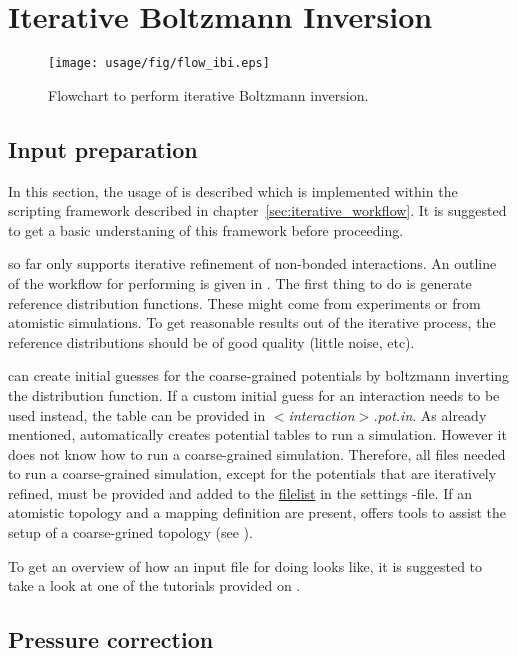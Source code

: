 \chapter{Iterative Boltzmann Inversion}
\begin{figure}
   \centering
   \texttt{[image: usage/fig/flow\_ibi.eps]}
   \caption{\label{fig:flow_ibi}Flowchart to perform iterative Boltzmann inversion.}
\end{figure}

\section{Input preparation}
In this section, the usage of \ibi is described which is implemented within the scripting framework described in chapter~\ref{sec:iterative_workflow}. It is suggested to get a basic understaning of this framework before proceeding.

\ibi so far only supports iterative refinement of non-bonded interactions. An outline of the workflow for performing \ibi is given in . The first thing to do is generate reference distribution functions. These might come from experiments or from atomistic simulations. To get reasonable results out of the iterative process, the reference distributions should be of good quality (little noise, etc).

\votca can create initial guesses for the coarse-grained potentials by boltzmann inverting the distribution function. If a custom initial guess for an interaction needs to be used instead, the table can be provided in \textit{$<$interaction$>$.pot.in}. As already mentioned, \votca automatically creates potential tables to run a simulation. However it does not know how to run a coarse-grained simulation. Therefore, all files needed to run a coarse-grained simulation, except for the potentials that are iteratively refined, must be provided and added to the \hyperlink{\cgref{inverse.filelist}}{filelist} in the settings \xml-file. If an atomistic topology and a mapping definition are present, \votca offers tools to assist the setup of a  coarse-grined topology (see ).

To get an overview of how an input file for doing \ibi looks like, it is suggested to take a look at one of the tutorials provided on \votcaweb.

\section{Pressure correction}

